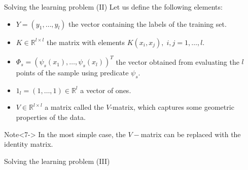 \documentclass[10pt, dvipsnames]{beamer}
\begin{document}
\begin{frame}{Solving the learning problem (II)}
    Let us define the following elements:
    
    \begin{itemize}
        \item<2->  $Y = (y_1, \dots, y_l)$ the vector containing the labels of the training set.
        \item<3-> $K \in \mathbb{R}^{l \times l}$ the matrix with elements $K(x_i, x_j),\; i, j = 1, \dots, l$.
        \item<4-> $\Phi_s = (\psi_s(x_1), \dots, \psi_s(x_l))^T$ the vector obtained from evaluating the $l$ points
        of the sample using predicate $\psi_s$.
        \item<5-> $1_l = (1, \dots, 1) \in \mathbb{R}^l$ a vector of ones.
        \item<6-> $V \in \mathbb{R}^{l \times l}$ a matrix called
the $V$-matrix, which captures some geometric properties of the data.
    \end{itemize}
    
    \begin{alertblock}{Note}<7->
        In the most simple case, the $V-$matrix can be replaced with the identity matrix.
    \end{alertblock}
\end{frame}

\begin{frame}{Solving the learning problem (III)}

    
\end{frame}
\end{document}
